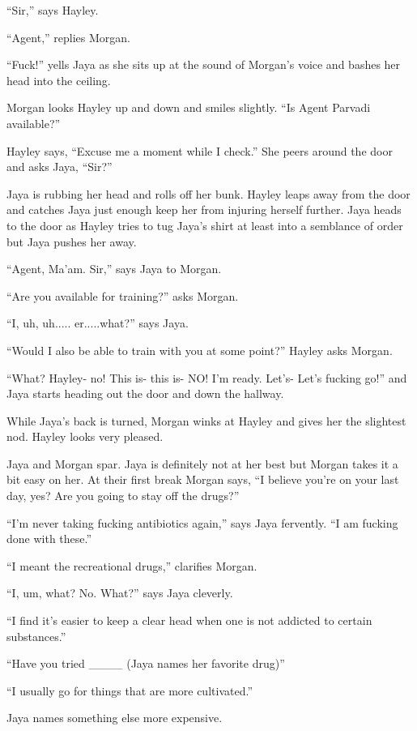 ``Sir,'' says Hayley.

``Agent,'' replies Morgan.

``Fuck!'' yells Jaya as she sits up at the sound of Morgan's voice and bashes her head into the ceiling.

Morgan looks Hayley up and down and smiles slightly.  ``Is Agent Parvadi available?''

Hayley says, ``Excuse me a moment while I check.''  She peers around the door and asks Jaya, ``Sir?''

Jaya is rubbing her head and rolls off her bunk.  Hayley leaps away from the door and catches Jaya just enough keep her from injuring herself further.  Jaya heads to the door as Hayley tries to tug Jaya's shirt at least into a semblance of order but Jaya pushes her away. 

``Agent, Ma'am. Sir,'' says Jaya to Morgan.

``Are you available for training?'' asks Morgan.

``I, uh, uh..... er.....what?'' says Jaya.

``Would I also be able to train with you at some point?'' Hayley asks Morgan.

``What?  Hayley- no!  This is- this is- NO!   I'm ready.  Let's- Let's fucking go!'' and Jaya starts heading out the door and down the hallway.

While Jaya's back is turned, Morgan winks at Hayley and gives her the slightest nod.  Hayley looks very pleased.



Jaya and Morgan spar.  Jaya is definitely not at her best but Morgan takes it a bit easy on her.  At their first break Morgan says, ``I believe you're on your last day, yes?  Are you going to stay off the drugs?''

``I'm never taking fucking antibiotics again,'' says Jaya fervently.  ``I am fucking done with these.''

``I meant the recreational drugs,'' clarifies Morgan.

``I, um, what? No.  What?'' says Jaya cleverly.

``I find it's easier to keep a clear head when one is not addicted to certain substances.''

``Have you tried \_\_\_\_ (Jaya names her favorite drug)''

``I usually go for things that are more cultivated.''

Jaya names something else more expensive.

